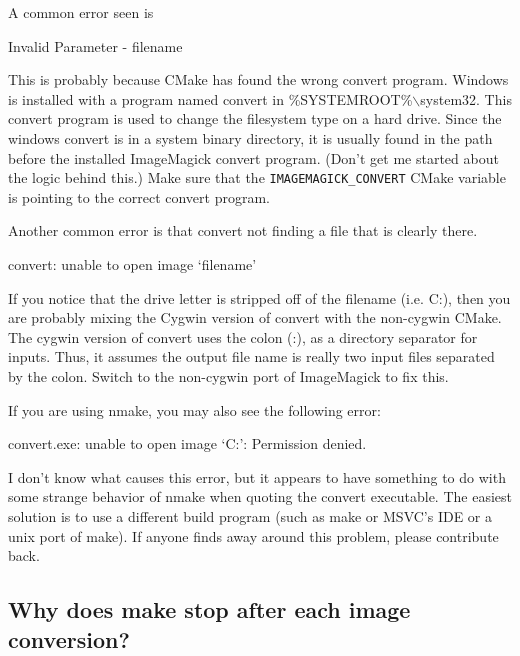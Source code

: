 \documentclass{article}
\newcommand*{\textfile}[1]{\textsf{#1}}
\newcommand*{\textprog}[1]{\textfile{#1}}
\newcommand*{\textcmake}[1]{\texttt{#1}}
\newcommand*{\textcmakevar}[1]{\textcmake{#1}}
\begin{document}
  A common error seen is 

  \begin{CodeListing}
Invalid Parameter - filename
  \end{CodeListing}

  This is probably because CMake has found the wrong \textprog{convert}
  program. Windows is installed with a program named \textprog{convert} in
  \textfile{\%SYSTEMROOT\%$\backslash$system32}. This \textprog{convert}
  program is used to change the filesystem type on a hard drive. Since the
  windows \textfile{convert} is in a system binary directory, it is usually
  found in the path before the installed ImageMagick \textfile{convert}
  program. (Don't get me started about the logic behind this.) Make sure
  that the \textcmakevar{IMAGEMAGICK\_CONVERT} CMake variable is pointing
  to the correct \textprog{convert} program.

  Another common error is that \textprog{convert} not finding a file that
  is clearly there.

  \begin{CodeListing}
convert: unable to open image `filename'
  \end{CodeListing}

  If you notice that the drive letter is stripped off of the filename
  (i.e. \textfile{C:}), then you are probably mixing the Cygwin version of
  \textprog{convert} with the non-cygwin CMake. The cygwin version of
  \textprog{convert} uses the colon (:), as a directory separator for
  inputs. Thus, it assumes the output file name is really two input files
  separated by the colon. Switch to the non-cygwin port of ImageMagick to
  fix this.

  If you are using nmake, you may also see the following error: 

  \begin{CodeListing}
convert.exe: unable to open image `C:': Permission denied.
  \end{CodeListing}

  I don't know what causes this error, but it appears to have something to
  do with some strange behavior of nmake when quoting the convert
  executable. The easiest solution is to use a different build program
  (such as make or MSVC's IDE or a unix port of make). If anyone finds away
  around this problem, please contribute back.

  \subsection{Why does make stop after each image conversion?}
  \label{sec:Why_does_make_stop_after_each_image_conversion}
\end{document}
